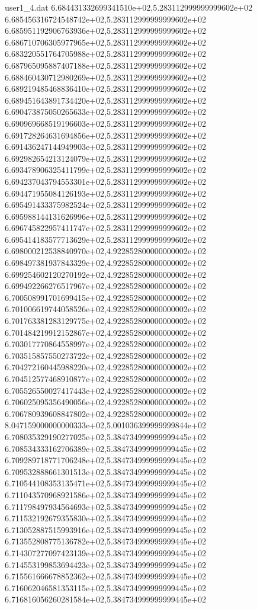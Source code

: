 \begin{filecontents}{user1_4.dat}
6.684431332699341510e+02,5.283112999999999602e+02
6.685456316724548742e+02,5.283112999999999602e+02
6.685951192906763936e+02,5.283112999999999602e+02
6.686710706305977965e+02,5.283112999999999602e+02
6.683220551764705988e+02,5.283112999999999602e+02
6.687965095887407188e+02,5.283112999999999602e+02
6.688460430712980269e+02,5.283112999999999602e+02
6.689219485468836410e+02,5.283112999999999602e+02
6.689451643891734420e+02,5.283112999999999602e+02
6.690473875050265633e+02,5.283112999999999602e+02
6.690969668519196603e+02,5.283112999999999602e+02
6.691728264631694856e+02,5.283112999999999602e+02
6.691436247144949903e+02,5.283112999999999602e+02
6.692982654213124079e+02,5.283112999999999602e+02
6.693478906325411799e+02,5.283112999999999602e+02
6.694237043794553301e+02,5.283112999999999602e+02
6.694471955084126193e+02,5.283112999999999602e+02
6.695491433375982524e+02,5.283112999999999602e+02
6.695988144131626996e+02,5.283112999999999602e+02
6.696745822957411747e+02,5.283112999999999602e+02
6.695414183577713629e+02,5.283112999999999602e+02
6.698000212538840970e+02,4.922852800000000002e+02
6.698497381937843329e+02,4.922852800000000002e+02
6.699254602120270192e+02,4.922852800000000002e+02
6.699492266276517967e+02,4.922852800000000002e+02
6.700508991701699415e+02,4.922852800000000002e+02
6.701006619744058526e+02,4.922852800000000002e+02
6.701763381283129775e+02,4.922852800000000002e+02
6.701484219912152867e+02,4.922852800000000002e+02
6.703017770864558997e+02,4.922852800000000002e+02
6.703515857550273722e+02,4.922852800000000002e+02
6.704272160445988220e+02,4.922852800000000002e+02
6.704512577468910877e+02,4.922852800000000002e+02
6.705526550027417443e+02,4.922852800000000002e+02
6.706025095356490056e+02,4.922852800000000002e+02
6.706780939608847802e+02,4.922852800000000002e+02
8.047159000000000333e+02,5.001036399999999844e+02
6.708035329190277025e+02,5.384734999999999445e+02
6.708534333162706389e+02,5.384734999999999445e+02
6.709289718771706248e+02,5.384734999999999445e+02
6.709532888661301513e+02,5.384734999999999445e+02
6.710544108353135471e+02,5.384734999999999445e+02
6.711043570968921586e+02,5.384734999999999445e+02
6.711798497934564693e+02,5.384734999999999445e+02
6.711532192679355830e+02,5.384734999999999445e+02
6.713052887515993916e+02,5.384734999999999445e+02
6.713552808775136782e+02,5.384734999999999445e+02
6.714307277097423139e+02,5.384734999999999445e+02
6.714553199853694423e+02,5.384734999999999445e+02
6.715561666678852362e+02,5.384734999999999445e+02
6.716062046581353115e+02,5.384734999999999445e+02
6.716816056260281584e+02,5.384734999999999445e+02

\end{filecontents}
